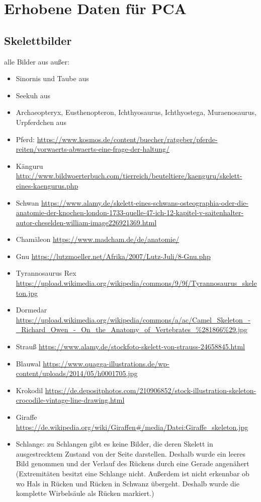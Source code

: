 \chapter{Erhobene Daten für PCA}
\label{appendix_pca}

 
 \section{Skelettbilder}
 \label{appendix_pca_skeletons}
 
 
 alle Bilder aus \cite{Spezielle_Zoologie} außer:
 \begin{itemize}
  \item Sinornis und Taube aus \cite{Vergleichende_Anatomie}
  \item Seekuh aus \cite{Zoologie25Wehner}
  \item Archaeopteryx, Eusthenopteron, Ichthyosaurus, Ichthyostega, Muraenosaurus, Urpferdchen aus \cite{Zoologie24Wehner}
  \item Pferd: \url{https://www.kosmos.de/content/buecher/ratgeber/pferde-reiten/vorwaerts-abwaerts-eine-frage-der-haltung/}
  \item Känguru \url{http://www.bildwoerterbuch.com/tierreich/beuteltiere/kaenguru/skelett-eines-kaengurus.php}
  \item Schwan \url{https://www.alamy.de/skelett-eines-schwans-osteographia-oder-die-anatomie-der-knochen-london-1733-quelle-47-ich-12-kapitel-v-saitenhalter-autor-cheselden-william-image226921369.html}
  \item Chamäleon \url{https://www.madcham.de/de/anatomie/}
  \item Gnu \url{https://lutzmoeller.net/Afrika/2007/Lutz-Juli/8-Gnu.php}
  \item Tyrannosaurus Rex \url{https://upload.wikimedia.org/wikipedia/commons/9/9f/Tyrannosaurus_skeleton.jpg}
  \item Dormedar \url{https://upload.wikimedia.org/wikipedia/commons/a/ac/Camel_Skeleton_-_Richard_Owen_-_On_the_Anatomy_of_Vertebrates_\%281866\%29.jpg}
  \item Strauß \url{https://www.alamy.de/stockfoto-skelett-von-strauss-24658845.html}
  \item Blauwal \url{https://www.quagga-illustrations.de/wp-content/uploads/2014/05/h0001705.jpg}
  \item Krokodil \url{https://de.depositphotos.com/210906852/stock-illustration-skeleton-crocodile-vintage-line-drawing.html}
  \item Giraffe \url{https://de.wikipedia.org/wiki/Giraffen#/media/Datei:Giraffe_skeleton.jpg}
  \item Schlange: zu Schlangen gibt es keine Bilder, die deren Skelett in ausgestrecktem Zustand von der Seite darstellen. Deshalb wurde ein leeres Bild genommen und der Verlauf des Rückens durch eine Gerade angenähert (Extremitäten besitzt eine Schlange nicht. Außerdem ist nicht erkennbar ob \bzw wo Hals in Rücken und Rücken in Schwanz übergeht. Deshalb wurde die komplette Wirbelsäule als Rücken markiert.)
 \end{itemize}

